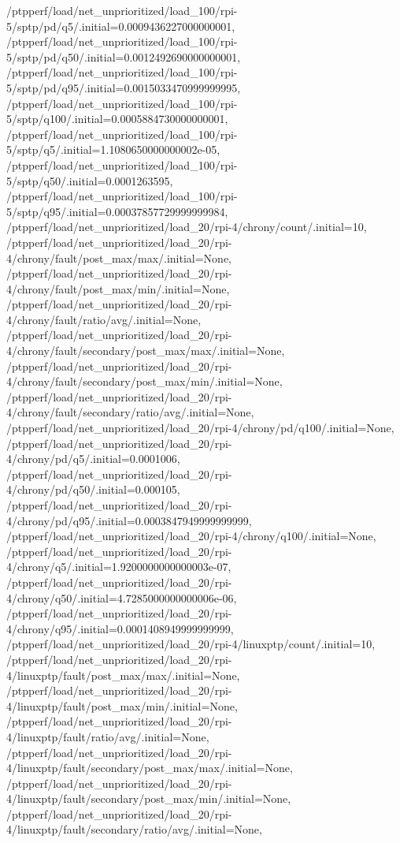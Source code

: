 {    /ptpperf/load/net_unprioritized/load_100/rpi-5/sptp/pd/q5/.initial=0.0009436227000000001,
    /ptpperf/load/net_unprioritized/load_100/rpi-5/sptp/pd/q50/.initial=0.0012492690000000001,
    /ptpperf/load/net_unprioritized/load_100/rpi-5/sptp/pd/q95/.initial=0.0015033470999999995,
    /ptpperf/load/net_unprioritized/load_100/rpi-5/sptp/q100/.initial=0.0005884730000000001,
    /ptpperf/load/net_unprioritized/load_100/rpi-5/sptp/q5/.initial=1.1080650000000002e-05,
    /ptpperf/load/net_unprioritized/load_100/rpi-5/sptp/q50/.initial=0.0001263595,
    /ptpperf/load/net_unprioritized/load_100/rpi-5/sptp/q95/.initial=0.00037857729999999984,
    /ptpperf/load/net_unprioritized/load_20/rpi-4/chrony/count/.initial=10,
    /ptpperf/load/net_unprioritized/load_20/rpi-4/chrony/fault/post_max/max/.initial=None,
    /ptpperf/load/net_unprioritized/load_20/rpi-4/chrony/fault/post_max/min/.initial=None,
    /ptpperf/load/net_unprioritized/load_20/rpi-4/chrony/fault/ratio/avg/.initial=None,
    /ptpperf/load/net_unprioritized/load_20/rpi-4/chrony/fault/secondary/post_max/max/.initial=None,
    /ptpperf/load/net_unprioritized/load_20/rpi-4/chrony/fault/secondary/post_max/min/.initial=None,
    /ptpperf/load/net_unprioritized/load_20/rpi-4/chrony/fault/secondary/ratio/avg/.initial=None,
    /ptpperf/load/net_unprioritized/load_20/rpi-4/chrony/pd/q100/.initial=None,
    /ptpperf/load/net_unprioritized/load_20/rpi-4/chrony/pd/q5/.initial=0.0001006,
    /ptpperf/load/net_unprioritized/load_20/rpi-4/chrony/pd/q50/.initial=0.000105,
    /ptpperf/load/net_unprioritized/load_20/rpi-4/chrony/pd/q95/.initial=0.0003847949999999999,
    /ptpperf/load/net_unprioritized/load_20/rpi-4/chrony/q100/.initial=None,
    /ptpperf/load/net_unprioritized/load_20/rpi-4/chrony/q5/.initial=1.9200000000000003e-07,
    /ptpperf/load/net_unprioritized/load_20/rpi-4/chrony/q50/.initial=4.7285000000000006e-06,
    /ptpperf/load/net_unprioritized/load_20/rpi-4/chrony/q95/.initial=0.0001408949999999999,
    /ptpperf/load/net_unprioritized/load_20/rpi-4/linuxptp/count/.initial=10,
    /ptpperf/load/net_unprioritized/load_20/rpi-4/linuxptp/fault/post_max/max/.initial=None,
    /ptpperf/load/net_unprioritized/load_20/rpi-4/linuxptp/fault/post_max/min/.initial=None,
    /ptpperf/load/net_unprioritized/load_20/rpi-4/linuxptp/fault/ratio/avg/.initial=None,
    /ptpperf/load/net_unprioritized/load_20/rpi-4/linuxptp/fault/secondary/post_max/max/.initial=None,
    /ptpperf/load/net_unprioritized/load_20/rpi-4/linuxptp/fault/secondary/post_max/min/.initial=None,
    /ptpperf/load/net_unprioritized/load_20/rpi-4/linuxptp/fault/secondary/ratio/avg/.initial=None,
}
